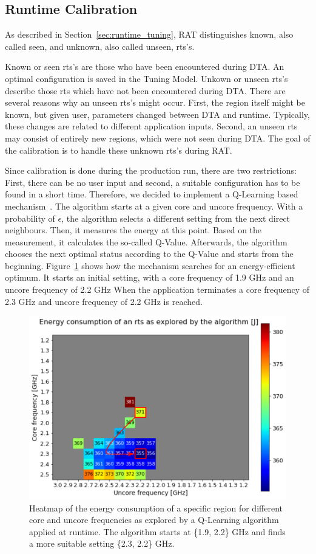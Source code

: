 \subsection{Runtime Calibration} \label{sec:calibration}

As described in Section~\ref{sec:runtime_tuning}, RAT distinguishes known, also called seen, and unknown, also called unseen, rts's.

Known or seen rts's are those who have been encountered during DTA.
An optimal configuration is saved in the Tuning Model.
Unkown or unseen rts's describe those rts which have not been encountered during DTA.
There are several reasons why an unseen rts's might occur.
First, the region itself might be known, but given user, parameters changed between DTA and runtime.
Typically, these changes are related to different application inputs.
Second, an unseen rts may consist of entirely new regions, which were not seen during DTA.
The goal of the calibration is to handle these unknown rts's during RAT.

Since calibration is done during the production run, there are two restrictions:
First, there can be no user input and second, a suitable configuration has to be found in a short time.
Therefore, we decided to implement a Q-Learning based mechanism~\cite{Gocht2019a}.
The algorithm starts at a given core and uncore frequency.
With a probability of {$\epsilon$}, the algorithm selects a different setting from the next direct neighbours.
Then, it measures the energy at this point.
Based on the measurement, it calculates the so-called Q-Value.
Afterwards, the algorithm chooses the next optimal status according to the Q-Value and starts from the beginning.
Figure~\ref{fig:qlearning} shows how the mechanism searches for an energy-efficient optimum.
It starts an initial setting, with a core frequency of 1.9 GHz and an uncore frequency of 2.2 GHz
When the application terminates a core frequency of 2.3 GHz and uncore frequency of 2.2 GHz is reached.

\begin{figure}[!t]
\centering
\includegraphics[width=.8\columnwidth]{figures/q_learning.png}
\caption{Heatmap of the energy consumption of a specific region for different core and uncore frequencies as explored by a Q-Learning algorithm applied at runtime.
The algorithm starts at \{1.9, 2.2\} GHz and finds a more suitable setting \{2.3, 2.2\} GHz.}
\label{fig:qlearning}
\end{figure}

